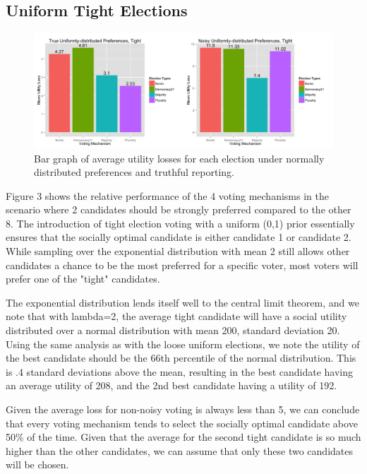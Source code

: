 \documentclass[11pt]{scrartcl}
\begin{document}
\subsection{Uniform Tight Elections}

\begin{figure}[H]\center
\includegraphics[scale=0.38]{uniform_tight.png}
\caption{Bar graph of average utility losses for each election under normally distributed preferences and truthful reporting.}
\end{figure}

Figure 3 shows the relative performance of the 4 voting mechanisms in the scenario where 2 candidates should be strongly preferred compared to the other 8. The introduction of tight election voting with a uniform (0,1) prior essentially ensures that the socially optimal candidate is either candidate 1 or candidate 2. While sampling over the exponential distribution with mean 2 still allows other candidates a chance to be the most preferred for a specific voter, most voters will prefer one of the "tight" candidates.

The exponential distribution lends itself well to the central limit theorem, and we note that with lambda=2, the average tight candidate will have a social utility distributed over a normal distribution with mean 200, standard deviation 20. Using the same analysis as with the loose uniform elections, we note the utility of the best candidate should be the $66$th percentile of the normal distribution. This is .4 standard deviations above the mean, resulting in the best candidate having an average utility of 208, and the 2nd best candidate having a utility of 192.

Given the average loss for non-noisy voting is always less than 5, we can conclude that every voting mechanism tends to select the socially optimal candidate above 50\% of the time. Given that the average for the second tight candidate is so much higher than the other candidates, we can assume that only these two candidates will be chosen.
\end{document}
